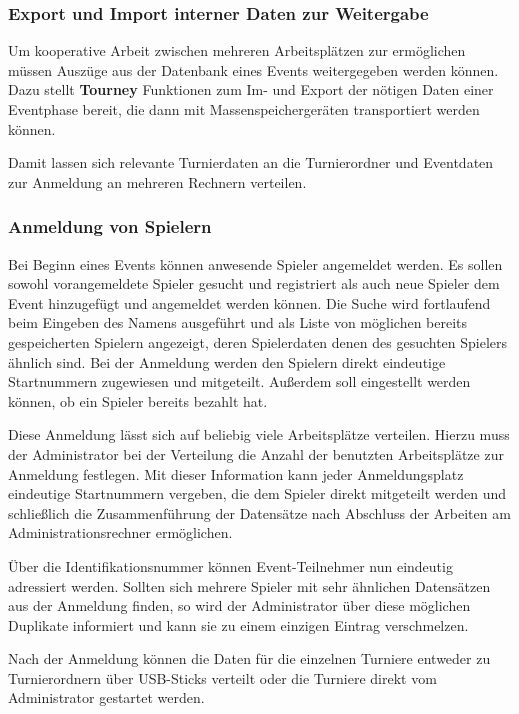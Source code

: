 \documentclass[11pt]{article}
\begin{document}
\subsubsection{Export und Import interner Daten zur Weitergabe}

Um kooperative Arbeit zwischen mehreren Arbeitsplätzen zur ermöglichen müssen Auszüge aus der Datenbank eines Events weitergegeben werden können. Dazu stellt \textbf{Tourney} Funktionen zum Im- und Export der nötigen Daten einer Eventphase bereit, die dann mit Massenspeichergeräten transportiert werden können.

Damit lassen sich relevante Turnierdaten an die Turnierordner und Eventdaten zur Anmeldung an mehreren Rechnern verteilen.

\newpage

\subsubsection{Anmeldung von Spielern}

Bei Beginn eines Events können anwesende Spieler angemeldet werden. Es sollen sowohl vorangemeldete Spieler gesucht und registriert als auch neue Spieler dem Event hinzugefügt und angemeldet werden können. Die Suche wird fortlaufend beim Eingeben des Namens ausgeführt und als Liste von möglichen bereits gespeicherten Spielern angezeigt, deren Spielerdaten denen des gesuchten Spielers ähnlich sind. Bei der Anmeldung werden den Spielern direkt eindeutige Startnummern zugewiesen und mitgeteilt. Außerdem soll eingestellt werden können, ob ein Spieler bereits bezahlt hat.

Diese Anmeldung lässt sich auf beliebig viele Arbeitsplätze verteilen. Hierzu muss der Administrator bei der Verteilung die Anzahl der benutzten Arbeitsplätze zur Anmeldung festlegen. Mit dieser Information kann jeder Anmeldungsplatz eindeutige Startnummern vergeben, die dem Spieler direkt mitgeteilt werden und schließlich die Zusammenführung der Datensätze nach Abschluss der Arbeiten am Administrationsrechner ermöglichen.

Über die Identifikationsnummer können Event-Teilnehmer nun eindeutig adressiert werden. Sollten sich mehrere Spieler mit sehr ähnlichen Datensätzen aus der Anmeldung finden, so wird der Administrator über diese möglichen Duplikate informiert und kann sie zu einem einzigen Eintrag verschmelzen.

Nach der Anmeldung können die Daten für die einzelnen Turniere entweder zu Turnierordnern über USB-Sticks verteilt oder die Turniere direkt vom Administrator gestartet werden.
\end{document}

